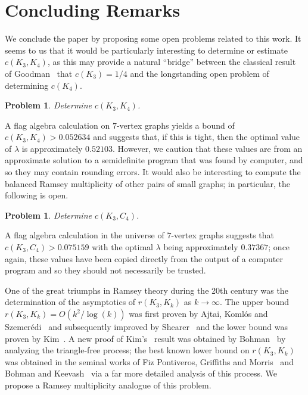 \documentclass[12pt]{article}
\numberwithin{equation}{section}
\newtheorem{prob}[equation]{Problem}
\theoremstyle{definition}
\theoremstyle{remark}
\begin{document}
\section{Concluding Remarks}
\label{sec:concl}

We conclude the paper by proposing some open problems related to this work. It seems to us that it would be particularly interesting to determine or estimate $c(K_3,K_4)$, as this may provide a natural ``bridge'' between the classical result of Goodman~\cite{Goodman59} that $c(K_3)=1/4$ and the longstanding open problem of determining $c(K_4)$. 

\begin{prob}
Determine $c(K_3,K_4)$. 
\end{prob}

A flag algebra calculation on $7$-vertex graphs yields a bound of $c(K_3,K_4)> 0.052634$ and suggests that, if this is tight, then the optimal value of $\lambda$ is approximately $0.52103$. However, we caution that these values are from an approximate solution to a semidefinite program that was found by computer, and so they may contain rounding errors. It would also be interesting to compute the balanced Ramsey multiplicity of other pairs of small graphs; in particular, the following is open. 


\begin{prob}
Determine $c(K_3,C_4)$. 
\end{prob}

A flag algebra calculation in the universe of $7$-vertex graphs suggests that $c(K_3,C_4)> 0.075159$ with the optimal $\lambda$ being approximately $0.37367$; once again, these values have been copied directly from the output of a computer program and so they should not necessarily be trusted. 

One of the great triumphs in Ramsey theory during the 20th century was the determination of the asymptotics of $r(K_3,K_k)$ as $k\to\infty$. The upper bound $r(K_3,K_k)=O(k^2/\log(k))$ was first proven by Ajtai, Koml\'os and Szemer\'edi~\cite{AjtaiKomlosSzemeredi80} and subsequently improved by Shearer~\cite{Shearer83} and the lower bound was proven by Kim~\cite{Kim95}. A new proof of Kim's~\cite{Kim95} result was obtained by Bohman~\cite{Bohman09} by analyzing the triangle-free process; the best known lower bound on $r(K_3,K_k)$ was obtained in the seminal works of Fiz Pontiveros, Griffiths and Morris~\cite{FizPontiverosGriffithsMorris20} and Bohman and Keevash~\cite{BohmanKeevash21} via a far more detailed analysis of this process. We propose a Ramsey multiplicity analogue of this problem.
\end{document}
